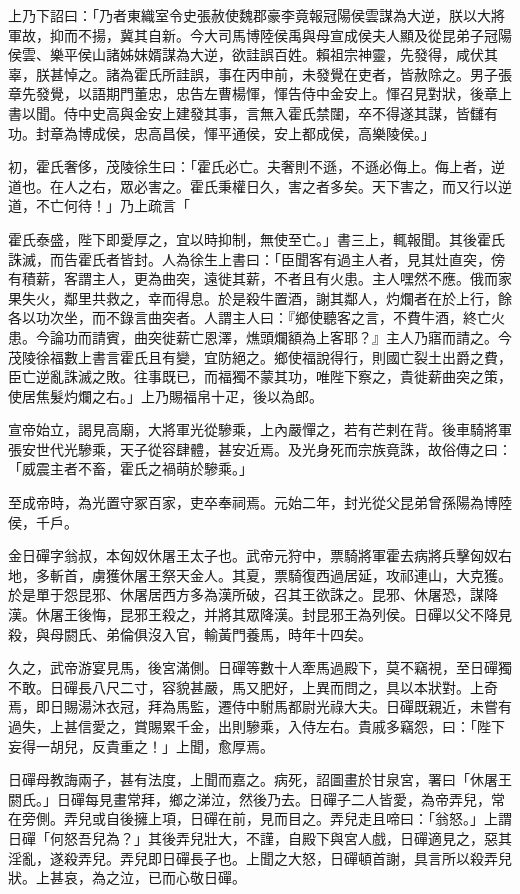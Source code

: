\begin{pinyinscope}
上乃下詔曰：「乃者東織室令史張赦使魏郡豪李竟報冠陽侯雲謀為大逆，朕以大將軍故，抑而不揚，冀其自新。今大司馬博陸侯禹與母宣成侯夫人顯及從昆弟子冠陽侯雲、樂平侯山諸姊妺婿謀為大逆，欲詿誤百姓。賴祖宗神靈，先發得，咸伏其辜，朕甚悼之。諸為霍氏所詿誤，事在丙申前，未發覺在吏者，皆赦除之。男子張章先發覺，以語期門董忠，忠告左曹楊惲，惲告侍中金安上。惲召見對狀，後章上書以聞。侍中史高與金安上建發其事，言無入霍氏禁闥，卒不得遂其謀，皆讎有功。封章為博成侯，忠高昌侯，惲平通侯，安上都成侯，高樂陵侯。」

初，霍氏奢侈，茂陵徐生曰：「霍氏必亡。夫奢則不遜，不遜必侮上。侮上者，逆道也。在人之右，眾必害之。霍氏秉權日久，害之者多矣。天下害之，而又行以逆道，不亡何待！」乃上疏言「

霍氏泰盛，陛下即愛厚之，宜以時抑制，無使至亡。」書三上，輒報聞。其後霍氏誅滅，而告霍氏者皆封。人為徐生上書曰：「臣聞客有過主人者，見其灶直突，傍有積薪，客謂主人，更為曲突，遠徙其薪，不者且有火患。主人嘿然不應。俄而家果失火，鄰里共救之，幸而得息。於是殺牛置酒，謝其鄰人，灼爛者在於上行，餘各以功次坐，而不錄言曲突者。人謂主人曰：『鄉使聽客之言，不費牛酒，終亡火患。今論功而請賓，曲突徙薪亡恩澤，燋頭爛額為上客耶？』主人乃寤而請之。今茂陵徐福數上書言霍氏且有變，宜防絕之。鄉使福說得行，則國亡裂土出爵之費，臣亡逆亂誅滅之敗。往事既已，而福獨不蒙其功，唯陛下察之，貴徙薪曲突之策，使居焦髮灼爛之右。」上乃賜福帛十疋，後以為郎。

宣帝始立，謁見高廟，大將軍光從驂乘，上內嚴憚之，若有芒剌在背。後車騎將軍張安世代光驂乘，天子從容肆體，甚安近焉。及光身死而宗族竟誅，故俗傳之曰：「威震主者不畜，霍氏之禍萌於驂乘。」

至成帝時，為光置守冢百家，吏卒奉祠焉。元始二年，封光從父昆弟曾孫陽為博陸侯，千戶。

金日磾字翁叔，本匈奴休屠王太子也。武帝元狩中，票騎將軍霍去病將兵擊匈奴右地，多斬首，虜獲休屠王祭天金人。其夏，票騎復西過居延，攻祁連山，大克獲。於是單于怨昆邪、休屠居西方多為漢所破，召其王欲誅之。昆邪、休屠恐，謀降漢。休屠王後悔，昆邪王殺之，并將其眾降漢。封昆邪王為列侯。日磾以父不降見殺，與母閼氏、弟倫俱沒入官，輸黃門養馬，時年十四矣。

久之，武帝游宴見馬，後宮滿側。日磾等數十人牽馬過殿下，莫不竊視，至日磾獨不敢。日磾長八尺二寸，容貌甚嚴，馬又肥好，上異而問之，具以本狀對。上奇焉，即日賜湯沐衣冠，拜為馬監，遷侍中駙馬都尉光祿大夫。日磾既親近，未嘗有過失，上甚信愛之，賞賜累千金，出則驂乘，入侍左右。貴戚多竊怨，曰：「陛下妄得一胡兒，反貴重之！」上聞，愈厚焉。

日磾母教誨兩子，甚有法度，上聞而嘉之。病死，詔圖畫於甘泉宮，署曰「休屠王閼氏。」日磾每見畫常拜，鄉之涕泣，然後乃去。日磾子二人皆愛，為帝弄兒，常在旁側。弄兒或自後擁上項，日磾在前，見而目之。弄兒走且啼曰：「翁怒。」上謂日磾「何怒吾兒為？」其後弄兒壯大，不謹，自殿下與宮人戲，日磾適見之，惡其淫亂，遂殺弄兒。弄兒即日磾長子也。上聞之大怒，日磾頓首謝，具言所以殺弄兒狀。上甚哀，為之泣，已而心敬日磾。


\end{pinyinscope}
